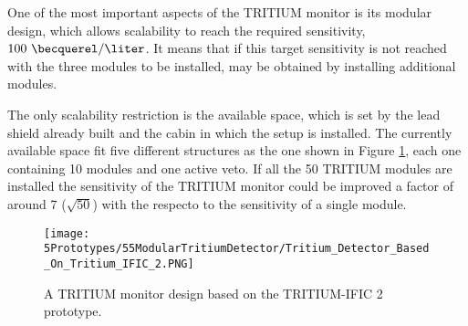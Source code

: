 One of the most important aspects of the TRITIUM monitor is its modular design, which allows scalability to reach the required sensitivity, $100~\becquerel/\liter$. It means that if this target sensitivity is not reached with the three modules to be installed, may be obtained by installing additional modules.

The only scalability restriction is the available space, which is set by the lead shield already built and the cabin in which the setup is installed. The currently available space fit five different structures as the one shown in Figure \ref{fig:TritiumMonitorIFIC2Design}, each one containing 10 modules and one active veto. If all the 50 TRITIUM modules are installed the sensitivity of the TRITIUM monitor could be improved a factor of around 7 ($\sqrt{50}$) with the respecto to the sensitivity of a single module.

\begin{figure}[h]
\centering
\texttt{[image: 5Prototypes/55ModularTritiumDetector/Tritium\_Detector\_Based\_On\_Tritium\_IFIC\_2.PNG]}
\caption{A TRITIUM monitor design based on the TRITIUM-IFIC 2 prototype.\label{fig:TritiumMonitorIFIC2Design}}
\end{figure}